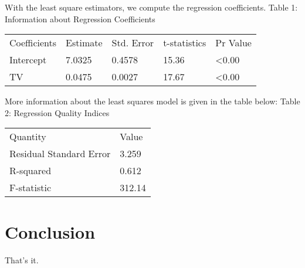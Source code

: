 \documentclass[a4paper]{article}
\begin{document}
With the least square estimators, we compute the regression coefficients.\newline
Table 1: Information about Regression Coefficients

\vspace{2mm}
\begin{tabular}{ | p{3cm} | p{2cm} | p{2cm} | p{2cm} | p{2cm} |}
  \hline			
  Coefficients & Estimate & Std. Error & t-statistics & Pr Value \\
  Intercept & 7.0325 & 0.4578 & 15.36 & <0.00 \\
  TV & 0.0475 & 0.0027 & 17.67 & <0.00 \\
  \hline  
\end{tabular}

\vspace{5mm}

More information about the least squares model is given in the table below: \newline
Table 2: Regression Quality Indices

\vspace{2mm}
\begin{tabular}{ | p{4cm} | p{2cm} | }
  \hline			
  Quantity & Value \\
  Residual Standard Error & 3.259 \\
  R-squared & 0.612 \\
  F-statistic & 312.14 \\
  \hline  
\end{tabular}

\section{Conclusion}
That's it.
\end{document}
